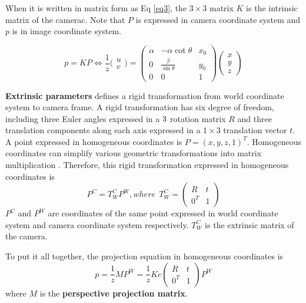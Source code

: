 When it is written in matrix form as Eq \ref{eq3}, the $3\times3$ matrix $K$ is the intrinsic matrix of the camerac. Note that $P$ is expressed in camera coordinate system and $p$ is in image coordinate system.

\begin{equation}
\label{eq3}
p = K P \Leftrightarrow \frac{1}{z}
\bigl(\begin{smallmatrix}
u\\  v 
\end{smallmatrix}\bigr) 
= 
\begin{pmatrix}
\alpha & -\alpha \cot\theta & x_0\\ 0 & \frac{\beta}{\sin\theta}  & y_0\\  0 &0  &1 
\end{pmatrix}
\begin{pmatrix} 
x\\  y\\  z
\end{pmatrix}
\end{equation}

\textbf{Extrinsic parameters} defines a rigid transformation from world coordinate system to camera frame. A rigid transformation has six degree of freedom, including three Euler angles expressed in a $3\time3$ rotation matrix $R$ and three translation components along each axis expressed in a $1\times3$ translation vector $t$. A point expressed in homogeneous coordinates is $P=(x, y, z, 1)^T$. Homogeneous coordinates can simplify various geometric transformations into matrix multiplication \cite{Forsyth:2002:CVM:580035}.  Therefore, this rigid transformation expressed in homogeneous coordinates is 
\begin{equation}
\label{eq4}
P^{C} = T_W^C P^W, where ~~T_W^C = 
\begin{pmatrix}
	R & t\\ 
	0^T& 1
\end{pmatrix}
\end{equation}
$P^{C}$ and $P^W$ are coordinates of the same point expressed in world coordinate system and camera coordinate system respectively. $T_W^C$ is the extrinsic matrix of the camera.

To put it all together, the projection equation in homogeneous coordinates is 
\begin{equation}
\label{eq5}
p = \frac{1}{z} M P^W = \frac{1}{z} K c
\begin{pmatrix}
R & t\\ 
0^T& 1
\end{pmatrix} P^W
\end{equation}
where $M$ is the \textbf{perspective projection matrix}.